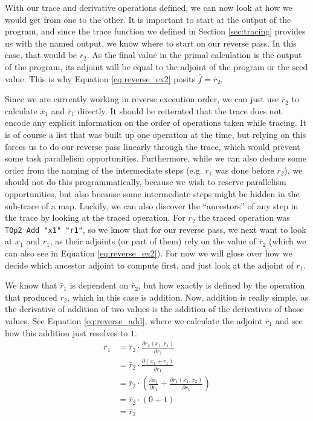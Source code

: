     With our trace and derivative operations defined, we can now look at how we would get from one to the other.
    It is important to start at the output of the program, and since the trace function we defined in Section \ref{sec:tracing} provides us with the named output, we know where to start on our reverse pass.
    In this case, that would be $r_2$.
    As the final value in the primal calculation is the output of the program, its adjoint will be equal to the adjoint of the program or the seed value.
    This is why Equation \ref{eq:reverse_ex2} posits $\bar{f}=\bar{r}_2$.

    Since we are currently working in reverse execution order, we can just use $\bar{r}_2$ to calculate $\bar{x}_1$ and $\bar{r}_1$ directly.
    It should be reiterated that the trace does not encode any explicit information on the order of operations taken while tracing.
    It is of course a list that was built up one operation at the time, but relying on this forces us to do our reverse pass linearly through the trace, which would prevent some task parallelism opportunities.
    Furthermore, while we can also deduce some order from the naming of the intermediate steps (e.g. $r_1$ was done before $r_2$), we should not do this programmatically, because we wish to reserve parallelism opportunities, but also because some intermediate steps might be hidden in the sub-trace of a map.
    Luckily, we can also discover the ``ancestors'' of any step in the trace by looking at the traced operation.
    For $r_2$ the traced operation was \texttt{TOp2 Add "x1" "r1"}, so we know that for our reverse pass, we next want to look at $x_1$ and $r_1$, as their adjoints (or part of them) rely on the value of $\bar{r}_2$ (which we can also see in Equation \ref{eq:reverse_ex2}).
    For now we will gloss over how we decide which ancestor adjoint to compute first, and just look at the adjoint of $r_1$.
    
    We know that $\bar{r}_1$ is dependent on $\bar{r}_2$, but how exactly is defined by the operation that produced $r_2$, which in this case is addition.
    Now, addition is really simple, as the derivative of addition of two values is the addition of the derivatives of those values.
    See Equation \ref{eq:reverse_add}, where we calculate the adjoint $\bar{r}_1$ and see how this addition just resolves to $1$.
    \begin{equation} \label{eq:reverse_add}
        \begin{aligned}
            \bar{r}_1&=\bar{r}_2\cdot\frac{\partial r_2(x_1, r_1)}{\partial r_1}\\
            &=\bar{r}_2\cdot\frac{\partial(x_1+r_1)}{\partial r_1}\\
            &=\bar{r}_2\cdot\left(\frac{\partial x_1}{\partial r_1}+\frac{\partial r_1(x_1,x_2)}{\partial r_1}\right)\\
            &=\bar{r}_2\cdot(0+1)\\
            &=\bar{r}_2
        \end{aligned}
    \end{equation}

